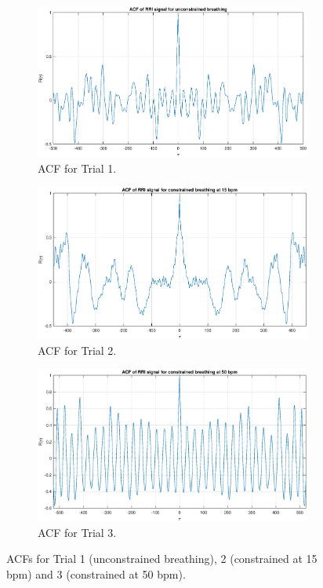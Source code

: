 \begin{figure}[H]
    \begin{center}
\begin{subfigure}{0.305\textwidth}
  \includegraphics[width=\linewidth]{assignment2figs/acf_uncon.eps}
  \caption{ACF for Trial 1.}
  \label{fig:acft1}
\end{subfigure}
\begin{subfigure}{0.305\textwidth}
  \includegraphics[width=\linewidth]{assignment2figs/acf_15.eps}
  \caption{ACF for Trial 2.}
  \label{fig:acft2}
\end{subfigure}
\begin{subfigure}{0.305\textwidth}
  \includegraphics[width=\linewidth]{assignment2figs/acf_50.eps}
  \caption{ACF for Trial 3.}
  \label{fig:acft3}
\end{subfigure}
\caption{ACFs for Trial 1 (unconstrained breathing), 2 (constrained at 15 bpm) and 3 (constrained at 50 bpm).}
\label{fig:hr_acfs}
\end{center}
\end{figure}

